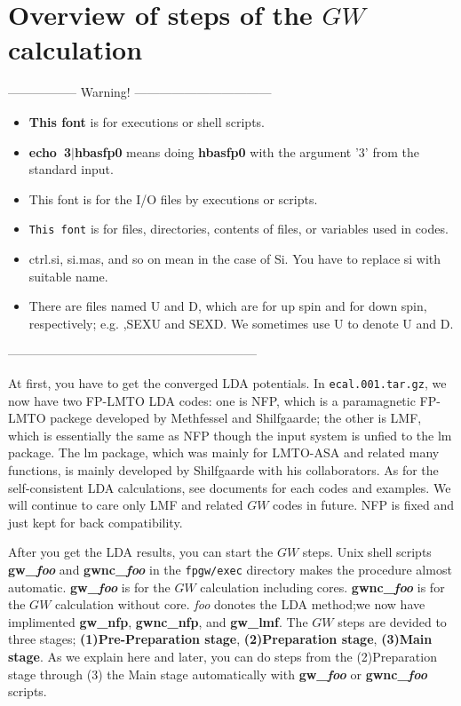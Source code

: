 \documentclass[a4paper,10pt,epsf,fleqn]{article}
\begin{document}
\newpage
\section{Overview of steps of the $GW$ calculation}

\noindent----------------- Warning! ---------------------------------
\begin{itemize}
\item
{\bf This font} is for executions or shell scripts.

\item
{\bf echo~3$|$hbasfp0 } means doing {\bf hbasfp0 } with the argument '3' from the standard input.

\item
{\sf This font} is for the I/O files by executions or scripts.

\item
{\tt This font} is for files, directories, contents of files, or variables used in codes.

\item
 ctrl.si, si.mas, and so on mean in the case of Si. You have to replace si with suitable name.

\item
 There are files named {U} and {D}, which are
 for up spin and for down spin, respectively; e.g. ,{\sf SEXU} and {\sf SEXD}.
 We sometimes use {U} to denote {U} and {D}.
\end{itemize}
\noindent------------------------------------------------------------

At first, you have to get the converged LDA potentials.
In {\tt ecal.001.tar.gz}, we now have two FP-LMTO LDA codes:
one is NFP, which is a paramagnetic FP-LMTO packege developed by Methfessel and Shilfgaarde;
the other is LMF, which is essentially the same as NFP though the 
input system is unfied to the lm package. 
The lm package, which was mainly for LMTO-ASA and related many functions,
is mainly developed by Shilfgaarde with his collaborators.
As for the self-consistent LDA calculations, 
see documents for each codes and examples.
We will continue to care only LMF and related
$GW$ codes in future.
NFP is fixed and just kept for back compatibility.

After you get the LDA results, you can start the $GW$ steps.
Unix shell scripts {\bf gw\_{\it foo}} and {\bf gwnc\_{\it foo}} in the {\tt fpgw/exec} directory
makes the procedure almost automatic.
{\bf gw\_{\it foo}} is for the $GW$ calculation including cores.
{\bf gwnc\_{\it foo}} is for the $GW$ calculation without core.
{\it foo} donotes the LDA method;we now have 
implimented {\bf gw\_nfp}, {\bf gwnc\_nfp}, and {\bf gw\_lmf}.
The $GW$ steps are devided to three stages; 
{\bf (1)Pre-Preparation stage}, {\bf (2)Preparation stage},
{\bf (3)Main stage}. As we explain here and later,
you can do steps from the (2)Preparation stage 
through (3) the Main stage automatically
with {\bf gw\_{\it foo}} or {\bf gwnc\_{\it foo}} scripts.
\end{document}
